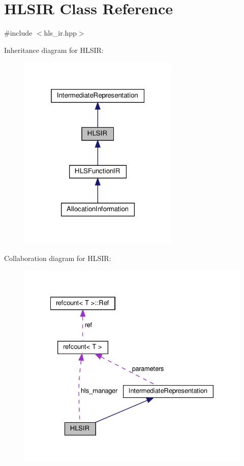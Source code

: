 \hypertarget{classHLSIR}{}\section{H\+L\+S\+IR Class Reference}
\label{classHLSIR}


{\ttfamily \#include $<$hls\+\_\+ir.\+hpp$>$}



Inheritance diagram for H\+L\+S\+IR\+:
\nopagebreak
\begin{figure}[H]
\begin{center}
\leavevmode
\includegraphics[width=217pt]{d4/d07/classHLSIR__inherit__graph}
\end{center}
\end{figure}


Collaboration diagram for H\+L\+S\+IR\+:
\nopagebreak
\begin{figure}[H]
\begin{center}
\leavevmode
\includegraphics[width=328pt]{d5/d2e/classHLSIR__coll__graph}
\end{center}
\end{figure}

